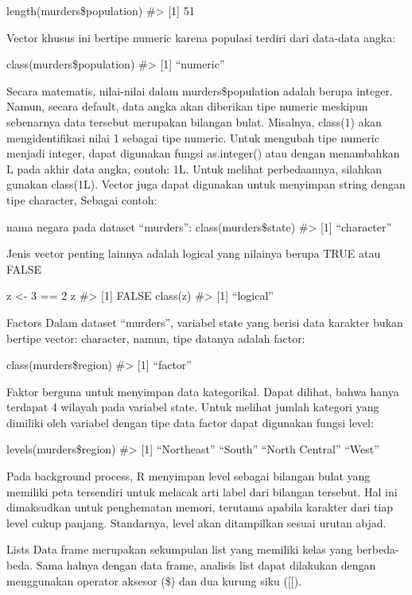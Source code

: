 \documentclass[
]{article}
\begin{document}
length(murders\$population) \#\textgreater{} {[}1{]} 51

Vector khusus ini bertipe numeric karena populasi terdiri dari data-data
angka:

class(murders\$population) \#\textgreater{} {[}1{]} ``numeric''

Secara matematis, nilai-nilai dalam murders\$population adalah berupa
integer. Namun, secara default, data angka akan diberikan tipe numeric
meskipun sebenarnya data tersebut merupakan bilangan bulat. Misalnya,
class(1) akan mengidentifikasi nilai 1 sebagai tipe numeric. Untuk
mengubah tipe numeric menjadi integer, dapat digunakan fungsi
as.integer() atau dengan menambahkan L pada akhir data angka, contoh:
1L. Untuk melihat perbedaannya, silahkan gunakan class(1L). Vector juga
dapat digunakan untuk menyimpan string dengan tipe character, Sebagai
contoh:

nama negara pada dataset ``murders'': class(murders\$state)
\#\textgreater{} {[}1{]} ``character''

Jenis vector penting lainnya adalah logical yang nilainya berupa TRUE
atau FALSE

z \textless- 3 == 2 z \#\textgreater{} {[}1{]} FALSE class(z)
\#\textgreater{} {[}1{]} ``logical''

Factors Dalam dataset ``murders'', variabel state yang berisi data
karakter bukan bertipe vector: character, namun, tipe datanya adalah
factor:

class(murders\$region) \#\textgreater{} {[}1{]} ``factor''

Faktor berguna untuk menyimpan data kategorikal. Dapat dilihat, bahwa
hanya terdapat 4 wilayah pada variabel state. Untuk melihat jumlah
kategori yang dimiliki oleh variabel dengan tipe data factor dapat
digunakan fungsi level:

levels(murders\$region) \#\textgreater{} {[}1{]} ``Northeast'' ``South''
``North Central'' ``West''

Pada background process, R menyimpan level sebagai bilangan bulat yang
memiliki peta tersendiri untuk melacak arti label dari bilangan
tersebut. Hal ini dimaksudkan untuk penghematan memori, terutama apabila
karakter dari tiap level cukup panjang. Standarnya, level akan
ditampilkan sesuai urutan abjad.

Lists Data frame merupakan sekumpulan list yang memiliki kelas yang
berbeda-beda. Sama halnya dengan data frame, analisis list dapat
dilakukan dengan menggunakan operator aksesor (\$) dan dua kurung siku
({[}{[}).
\end{document}

